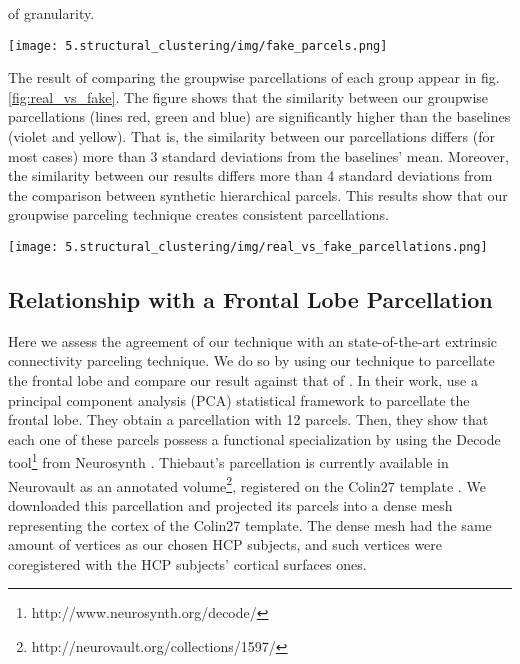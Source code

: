 of granularity.
%
\begin{figure*}
    \texttt{[image: 5.structural\_clustering/img/fake\_parcels.png]}
    \caption{Examples of synthetic parcellations created to compute a baseline
             adjusted rand index. Parcellations on the left were created by 
             dividing the brain in a homogeneous way, inspired by the random
             parcellation presented in \citet{Paristot2015}. Parcellations on
             the right were created by randomly merging parcels of a coarse
             parcellation.}
    \label{fig:fake_parcels}
\end{figure*}
%
The result of comparing the groupwise parcellations of each group appear in
fig. \ref{fig:real_vs_fake}. The figure shows that the similarity between
our groupwise parcellations (lines red, green and blue) are significantly
higher than the baselines (violet and yellow). That is, the similarity
between our parcellations differs (for most cases) more than 3 standard 
deviations from the baselines' mean. Moreover, the similarity between our
results differs more
than 4 standard deviations from the comparison between synthetic hierarchical
parcels. This results show that our groupwise parceling technique creates
consistent parcellations.
%
\begin{figure*}
    \centering
    \texttt{[image: 5.structural\_clustering/img/real\_vs\_fake\_parcellations.png]}
    \caption{Adjusted Rand Index obtained when comparing: (red) Group A vs Group B;
             (blue) Group A vs Group C; (green) Group B vs Group C; (purple)
             Synthetic Homogeneous Parcels and (yellow) Synthetic hierarchical
             Parcels.}
    \label{fig:real_vs_fake}
\end{figure*}
%
\subsection{Relationship with a Frontal Lobe Parcellation}
Here we assess the agreement of our technique with an state-of-the-art extrinsic 
connectivity parceling technique. We do so by using our technique to parcellate 
the frontal lobe and compare our result against that of \citet{ThiebautdeSchotten2016}. 
In their work, \citet{ThiebautdeSchotten2016} use a principal component analysis (PCA)
statistical framework to parcellate the frontal lobe. They obtain a parcellation
with 12 parcels. Then, they show that each one of these parcels possess a functional
specialization by using the Decode tool\footnote{http://www.neurosynth.org/decode/}
from Neurosynth \citep{Yarkoni2011}. 
Thiebaut's parcellation is currently available in Neurovault \citep{Gorgolewski2016}
as an annotated volume\footnote{http://neurovault.org/collections/1597/}, registered
on the Colin27 template \citep{Holmes1996}. We downloaded this
parcellation and projected its parcels into a dense mesh representing the
cortex of the Colin27 template. The dense mesh had the same amount of vertices
as our chosen HCP subjects, and such vertices were coregistered with the
HCP subjects' cortical surfaces ones.

